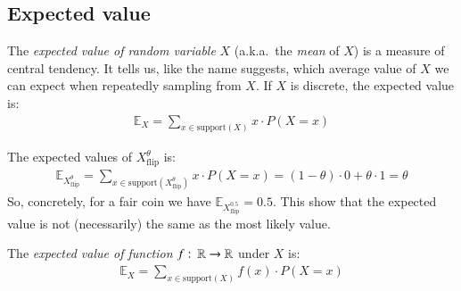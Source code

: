 \documentclass[nobib,nofonts]{tufte-handout}
\renewcommand{\markdef}[1]{\emph{#1}}
\newcommand{\mult}{\ensuremath{\cdot}}
\begin{document}



\subsection{Expected value}

The \markdef{expected value of random variable} $X$ (a.k.a.~the \emph{mean} of $X$) is a measure of central tendency.
It tells us, like the name suggests, which average value of $X$ we can expect when repeatedly sampling from $X$.
If $X$ is discrete, the expected value is:
\begin{align*}
  \mathds{E}_X = \sum_{x \in \text{support}(X)} x \mult P(X = x)
\end{align*}

\begin{example}
  The expected values of $X_{\text{flip}}^{\theta}$ is:
  \begin{align*}
    \mathds{E}_{X_{\text{flip}}^{\theta}} = \sum_{x \in \text{support}(X_{\text{flip}}^{\theta})} x \mult P(X = x) = (1- \theta) \mult 0 + \theta \mult 1 = \theta
  \end{align*}
  So, concretely, for a fair coin we have $\mathds{E}_{X_{\text{flip}}^{0.5}} = 0.5$.
  This show that the expected value is not (necessarily) the same as the most likely value.
\end{example}

The \markdef{expected value of function} $f \thinspace \colon \thinspace \mathbb{R} \rightarrow \mathbb{R}$ under $X$ is:
\begin{align*}
  \mathds{E}_X = \sum_{x \in \text{support}(X)} f(x) \mult P(X = x)
\end{align*}
\end{document}
